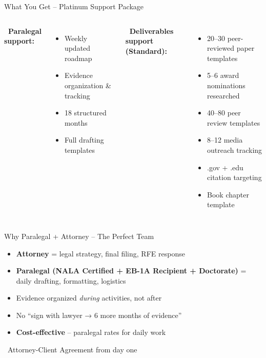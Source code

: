 \documentclass[aspectratio=169, 10pt]{beamer}
\begin{document}
	\begin{frame}{What You Get -- Platinum Support Package}
		\begin{columns}[T]
			\textbf{\faUserGraduate \ Paralegal support:}
			\begin{itemize}
				\item Weekly updated roadmap
				\item Evidence organization \& tracking
				\item 18 structured months
				\item Full drafting templates
			\end{itemize}
			
			\textbf{\faGem \ Deliverables support (Standard):}
			\begin{itemize}
				\item 20--30 peer-reviewed paper templates
				\item 5--6 award nominations researched
				\item 40--80 peer review templates
				\item 8--12 media outreach tracking
				\item .gov + .edu citation targeting
				\item Book chapter template
			\end{itemize}
		\end{columns}
	\end{frame}
	
	\begin{frame}{Why Paralegal + Attorney -- The Perfect Team}
		\begin{itemize}
			\item \textbf{Attorney} = legal strategy, final filing, RFE response
			\item \textbf{Paralegal (NALA Certified + EB-1A Recipient + Doctorate)} = daily drafting, formatting, logistics
			\item Evidence organized \textit{during} activities, not after
			\item No ``sign with lawyer → 6 more months of evidence''
			\item \textbf{Cost-effective} -- paralegal rates for daily work
		\end{itemize}
		
		\vspace{0.5cm}
		\centering
		\textcolor{navyblue}{\Large \faGavel \  Attorney-Client Agreement from day one}
	\end{frame}
	
\end{document}
